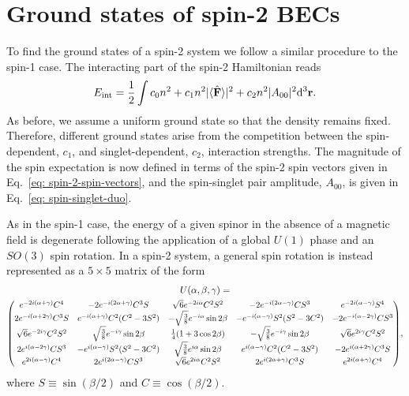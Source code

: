 \section{Ground states of spin-2 BECs}\label{sec: ground-states-spin-2}
To find the ground states of a spin-2 system we follow a similar procedure to
the spin-1 case.
The interacting part of the spin-2 Hamiltonian reads
\begin{align}
    E_\mathrm{int} = \frac{1}{2}\int c_0n^2 + c_1n^2|\langle \hat{\vb{F}} \rangle |^2+c_2n^2|A_{00}|^2
    \dd^3\vb{r}.
\end{align}
As before, we assume a uniform ground state so that the density remains fixed.
Therefore, different ground states arise from the competition between the
spin-dependent, \(c_1\), and singlet-dependent, \(c_2\), interaction strengths.
The magnitude of the spin expectation is now defined in terms of the spin-2
spin vectors given in Eq.~\eqref{eq: spin-2-spin-vectors}, and the spin-singlet
pair amplitude, \(A_{00}\), is given in Eq.~\eqref{eq: spin-singlet-duo}.

As in the spin-1 case, the energy of a given spinor in the absence of a magnetic
field is degenerate following the application of a global \(U(1)\) phase and an
\(SO(3)\) spin rotation.
In a spin-2 system, a general spin rotation is instead represented as a
\(5\times 5\) matrix of the form~\cite{Kawaguchi2012}
\begin{multline}\label{eq: spin-2-rotation-matrix}
    U(\alpha, \beta, \gamma) = \\
    \scalemath{0.90}{\mqty(
    e^{-2i(\alpha + \gamma)}C^4 & -2e^{-i(2\alpha+\gamma)}C^3S
    & \sqrt{6}e^{-2i\alpha}C^2S^2 & -2e^{-i(2\alpha-\gamma)}CS^3
    & e^{-2i(\alpha - \gamma)}S^4
    \\
    2e^{-i(\alpha+2\gamma)}C^3S & e^{-i(\alpha+\gamma)}C^2(C^2-3S^2)
    & -\sqrt{\frac{3}{8}}e^{-i\alpha}\sin 2\beta
    & -e^{-i(\alpha-\gamma)}S^2(S^2-3C^2) & -2e^{-i(\alpha-2\gamma)}CS^3
    \\
    \sqrt{6}e^{-2i\gamma}C^2S^2 & \sqrt{\frac{3}{8}}e^{-i\gamma}\sin 2\beta
    & \frac{1}{4}(1+3\cos 2\beta)
    & -\sqrt{\frac{3}{8}}e^{-i\gamma}\sin 2\beta
    & \sqrt{6}e^{2i\gamma}C^2S^2
    \\
    2e^{i(\alpha-2\gamma)}CS^3 & -e^{i(\alpha-\gamma)}S^2(S^2-3C^2)
    & \sqrt{\frac{3}{8}}e^{i\alpha}\sin 2\beta
    & e^{i(\alpha-\gamma)}C^2(C^2-3S^2) & -2e^{i(\alpha+2\gamma)}C^3S
    \\
    e^{2i(\alpha - \gamma)}C^4 & 2e^{i(2\alpha-\gamma)}CS^3
    & \sqrt{6}e^{2i\alpha}C^2S^2 & 2e^{i(2\alpha+\gamma)}C^3S
    & e^{2i(\alpha + \gamma)}C^4
    )},
\end{multline}
where \(S \equiv \sin(\beta/2)\) and \(C \equiv \cos(\beta/2)\).

